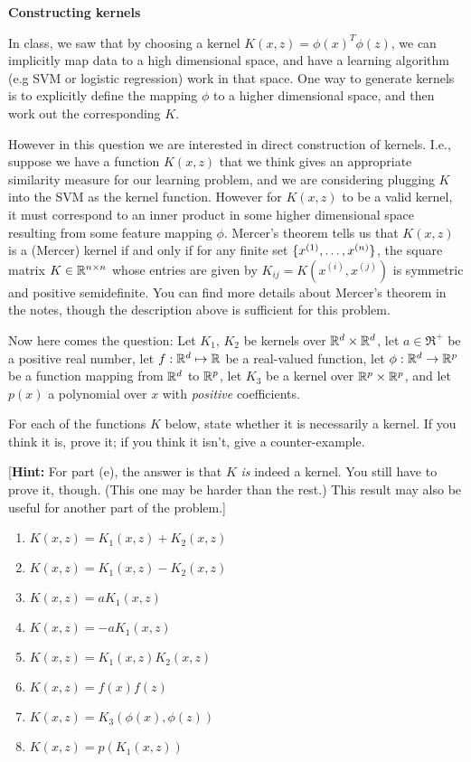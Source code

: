 \item {\bf Constructing kernels}

In class, we saw that by choosing a kernel $K(x,z) = \phi(x)^T\phi(z)$, we can
implicitly map data to a high dimensional space, and have a learning algorithm (e.g SVM or logistic regression)
work in that space. One way to generate kernels is to explicitly define the
mapping $\phi$ to a higher dimensional space, and then work out the
corresponding $K$.

However in this question we are interested in direct construction of kernels.
I.e., suppose we have a function $K(x,z)$ that we think gives an appropriate
similarity measure for our learning problem, and we are considering plugging
$K$ into the SVM as the kernel function. However for $K(x,z)$ to be a valid
kernel, it must correspond to an inner product in some higher dimensional space
resulting from some feature mapping $\phi$.  Mercer's theorem tells us that
$K(x,z)$ is a (Mercer) kernel if and only if for any finite set $\{x^{(1)},
\ldots, x^{({n})}\}$, the square matrix $K \in \mathbb{R}^{{n} \times {n}}$ whose entries
are given by $K_{ij} = K(x^{(i)},x^{(j)})$ is symmetric and positive
semidefinite. You can find more details about Mercer's theorem in the notes,
though the description above is sufficient for this problem.

Now here comes the question: Let $K_1$, $K_2$ be kernels over $\mathbb{R}^{{d}} \times
\mathbb{R}^{{d}}$, let $a \in \Re^+$ be a positive real number, let $f : \mathbb{R}^{{d}} \mapsto
\mathbb{R}$ be a real-valued function, let $\phi: \mathbb{R}^{{d}} \rightarrow \mathbb{R}^{p}$ be a
function mapping from $\mathbb{R}^{{d}}$ to $\mathbb{R}^{p}$, let $K_3$ be a kernel over $\mathbb{R}^{p}
\times \mathbb{R}^{p}$, and let $p(x)$ a polynomial over $x$ with \emph{positive}
coefficients.

For each of the functions $K$ below, state whether it is necessarily a
kernel.  If you think it is, prove it; if you think it isn't, give a
counter-example.

[\textbf{Hint:} For part (e), the answer is that $K$ \emph{is} indeed
a kernel. You still have to prove it, though.  (This one may be harder than the
rest.)  This result may also be useful for another part of the problem.]

\begin{enumerate}

\item {} $K(x,z) = K_1(x,z) + K_2(x,z)$
\item {} $K(x,z) = K_1(x,z) - K_2(x,z)$
\item {} $K(x,z) = a K_1(x,z)$
\item {} $K(x,z) = -a K_1(x,z)$
\item {} $K(x,z) = K_1(x,z)K_2(x,z)$
\item {} $K(x,z) = f(x)f(z)$
\item {} $K(x,z) = K_3(\phi(x),\phi(z))$
\item {} $K(x,z) = p(K_1(x,z))$

\end{enumerate}